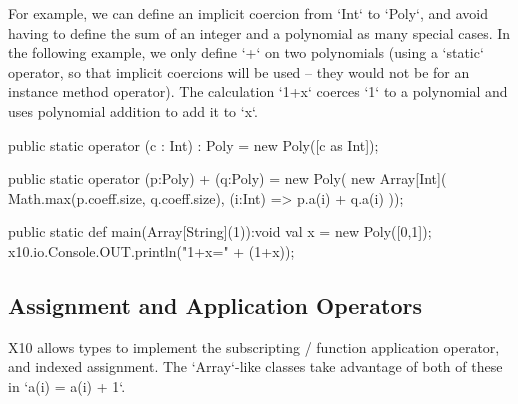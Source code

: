 For example, we can define an implicit coercion from \xcd`Int` to \xcd`Poly`,
and avoid having to define the sum of an integer and a polynomial
as many special cases.  In the following example, we only define \xcd`+` on
two polynomials (using a \xcd`static` operator, so that implicit coercions
will be used -- they would not be for an instance method operator).  The
calculation \xcd`1+x` coerces \xcd`1` to a polynomial and uses polynomial
addition to add it to \xcd`x`.


\begin{xten}
  public static operator (c : Int) : Poly = new Poly([c as Int]);

  public static operator (p:Poly) + (q:Poly) = new Poly(
      new Array[Int](
        Math.max(p.coeff.size, q.coeff.size),
        (i:Int) => p.a(i) + q.a(i)
     ));

  public static def main(Array[String](1)):void {
     val x = new Poly([0,1]);
     x10.io.Console.OUT.println("1+x=" + (1+x));
  }
\end{xten}


\subsection{Assignment and Application Operators}
\index{()}
\index{()=}
\label{set-and-apply}
X10 allows types to implement the subscripting / function application
operator, and indexed assignment.  The \xcd`Array`-like classes take advantage
of both of these in \xcd`a(i) = a(i) + 1`.  

